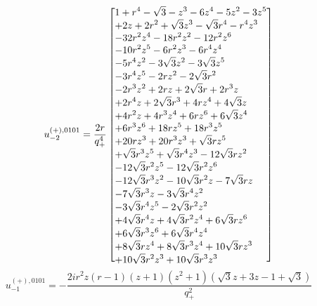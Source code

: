 \documentclass[11pt,a4paper]{article}
\begin{document}
\begin{equation}
u_{-2}^{(+),0101}=\frac{2 r}{q_{+}^{4}}\left[\vcenter{\hbox{\shortstack[l]{$\displaystyle 1 + r^{4} - \sqrt{3} - z^{3} - 6 z^{4} - 5 z^{2} - 3 z^{5}$\\
$\displaystyle  + 2 z + 2 r^{2} + \sqrt{3} z^{3} - \sqrt{3} r^{4} - r^{4} z^{3}$\\
$\displaystyle  - 32 r^{2} z^{4} - 18 r^{2} z^{2} - 12 r^{2} z^{6}$\\
$\displaystyle  - 10 r^{2} z^{5} - 6 r^{2} z^{3} - 6 r^{4} z^{4}$\\
$\displaystyle  - 5 r^{4} z^{2} - 3 \sqrt{3} z^{2} - 3 \sqrt{3} z^{5}$\\
$\displaystyle  - 3 r^{4} z^{5} - 2 r z^{2} - 2 \sqrt{3} r^{2}$\\
$\displaystyle  - 2 r^{3} z^{2} + 2 r z + 2 \sqrt{3} r + 2 r^{3} z$\\
$\displaystyle  + 2 r^{4} z + 2 \sqrt{3} r^{3} + 4 r z^{4} + 4 \sqrt{3} z$\\
$\displaystyle  + 4 r^{2} z + 4 r^{3} z^{4} + 6 r z^{6} + 6 \sqrt{3} z^{4}$\\
$\displaystyle  + 6 r^{3} z^{6} + 18 r z^{5} + 18 r^{3} z^{5}$\\
$\displaystyle  + 20 r z^{3} + 20 r^{3} z^{3} + \sqrt{3} r z^{5}$\\
$\displaystyle  + \sqrt{3} r^{3} z^{5} + \sqrt{3} r^{4} z^{3} - 12 \sqrt{3} r z^{2}$\\
$\displaystyle  - 12 \sqrt{3} r^{2} z^{5} - 12 \sqrt{3} r^{2} z^{6}$\\
$\displaystyle  - 12 \sqrt{3} r^{3} z^{2} - 10 \sqrt{3} r^{2} z - 7 \sqrt{3} r z$\\
$\displaystyle  - 7 \sqrt{3} r^{3} z - 3 \sqrt{3} r^{4} z^{2}$\\
$\displaystyle  - 3 \sqrt{3} r^{4} z^{5} - 2 \sqrt{3} r^{2} z^{2}$\\
$\displaystyle  + 4 \sqrt{3} r^{4} z + 4 \sqrt{3} r^{2} z^{4} + 6 \sqrt{3} r z^{6}$\\
$\displaystyle  + 6 \sqrt{3} r^{3} z^{6} + 6 \sqrt{3} r^{4} z^{4}$\\
$\displaystyle  + 8 \sqrt{3} r z^{4} + 8 \sqrt{3} r^{3} z^{4} + 10 \sqrt{3} r z^{3}$\\
$\displaystyle  + 10 \sqrt{3} r^{2} z^{3} + 10 \sqrt{3} r^{3} z^{3}$}}}\right]
\label{eq:cat-auxiliary-plus-0101-m2}
\end{equation}
\begin{equation}
u_{-1}^{(+),0101}=- \frac{2 i r^{2} z \left(r - 1\right) \left(z + 1\right) \left(z^{2} + 1\right) \left(\sqrt{3} z + 3 z - 1 + \sqrt{3}\right)}{q_{+}^{2}}
\label{eq:cat-auxiliary-plus-0101-m1}
\end{equation}
\end{document}
